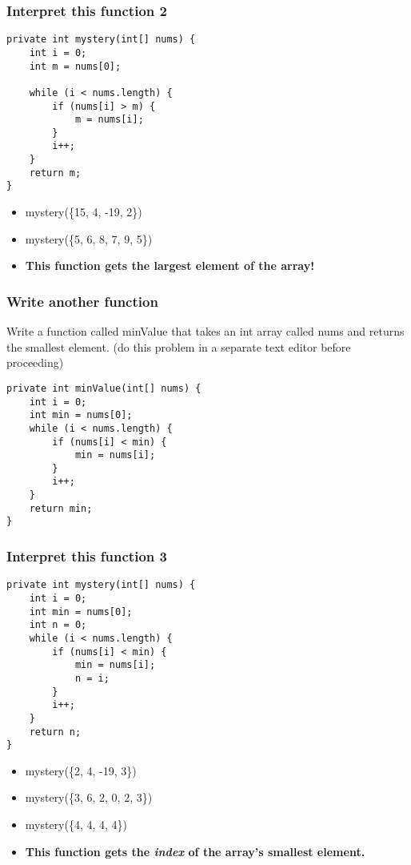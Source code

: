 \documentclass{beamer}
\begin{document}
\begin{frame}[fragile]
\frametitle{Interpret this function 2}
\begin{lstlisting}
private int mystery(int[] nums) {
    int i = 0;
    int m = nums[0];
    
    while (i < nums.length) {
        if (nums[i] > m) {
            m = nums[i];
        }
        i++;
    }
    return m;
}
\end{lstlisting}
\begin{itemize}
\item<2-> mystery(\{15, 4, -19, 2\})
\item<3-> mystery(\{5, 6, 8, 7, 9, 5\})
\item<4-> \textbf{This function gets the largest element of the array!}
\end{itemize}
\end{frame}

\begin{frame}[fragile]
\frametitle{Write another function}
Write a function called minValue that takes an int array called nums and returns the smallest element.
\pause
(do this problem in a separate text editor before proceeding)
\pause
\begin{lstlisting}
private int minValue(int[] nums) {
    int i = 0;
    int min = nums[0];
    while (i < nums.length) {
        if (nums[i] < min) {
            min = nums[i];
        }
        i++;
    }
    return min;
}
\end{lstlisting}
\end{frame}

\begin{frame}[fragile]
\frametitle{Interpret this function 3}
\begin{lstlisting}
private int mystery(int[] nums) {
    int i = 0;
    int min = nums[0];
    int n = 0;
    while (i < nums.length) {
        if (nums[i] < min) {
            min = nums[i];
            n = i;
        }
        i++;
    }
    return n;
}
\end{lstlisting}
\begin{itemize}
\item<2-> mystery(\{2, 4, -19, 3\})
\item<3-> mystery(\{3, 6, 2, 0, 2, 3\})
\item<4-> mystery(\{4, 4, 4, 4\})
\item<5-> \textbf{This function gets the \textit{index} of the array's smallest element.}
\end{itemize}
\end{frame}
\end{document}
